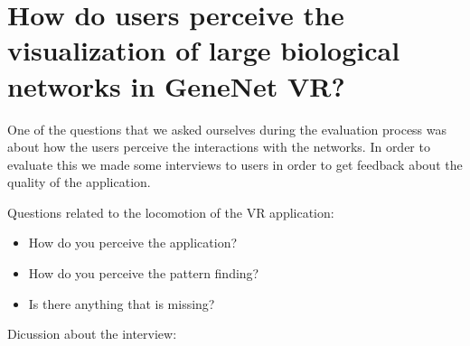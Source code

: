 \section{How do users perceive the visualization of large biological networks in GeneNet VR?}
One of the questions that we asked ourselves during the evaluation process was about how the users perceive the interactions with the networks. In order to evaluate this we made some interviews to users in order to get feedback about the quality of the application.

Questions related to the locomotion of the VR application:
\begin{itemize}
  \item How do you perceive the application?
  \item How do you perceive the pattern finding?
  \item Is there anything that is missing?
\end{itemize}

Dicussion about the interview:
%


